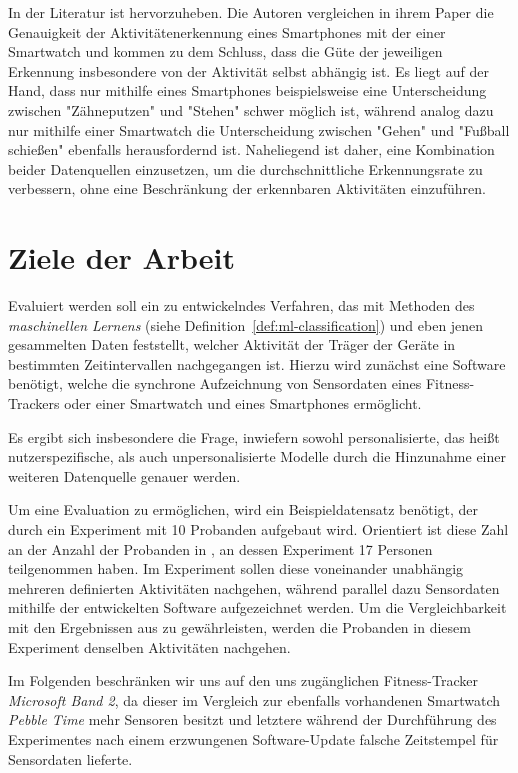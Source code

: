 In der Literatur ist \cite{Weiss2016} hervorzuheben. Die Autoren vergleichen in ihrem Paper die Genauigkeit der Aktivitätenerkennung eines Smartphones mit der einer Smartwatch und kommen zu dem Schluss, dass die Güte der jeweiligen Erkennung insbesondere von der Aktivität selbst abhängig ist. Es liegt auf der Hand, dass nur mithilfe eines Smartphones beispielsweise eine Unterscheidung zwischen "Zähneputzen" und "Stehen" schwer möglich ist, während analog dazu nur mithilfe einer Smartwatch die Unterscheidung zwischen "Gehen" und "Fußball schießen" ebenfalls herausfordernd ist. Naheliegend ist daher, eine Kombination beider Datenquellen einzusetzen, um die durchschnittliche Erkennungsrate zu verbessern, ohne eine Beschränkung der erkennbaren Aktivitäten einzuführen.

\section{Ziele der Arbeit} %
\label{sec:goals}
Evaluiert werden soll ein zu entwickelndes Verfahren, das mit Methoden des \textit{maschinellen Lernens} (siehe Definition~\ref{def:ml-classification}) und eben jenen gesammelten Daten feststellt, welcher Aktivität der Träger der Geräte in bestimmten Zeitintervallen nachgegangen ist. Hierzu wird zunächst eine Software benötigt, welche die synchrone Aufzeichnung von Sensordaten eines Fitness-Trackers oder einer Smartwatch und eines Smartphones ermöglicht.

Es ergibt sich insbesondere die Frage, inwiefern sowohl personalisierte, das heißt nutzerspezifische, als auch unpersonalisierte Modelle durch die Hinzunahme einer weiteren Datenquelle genauer werden.

Um eine Evaluation zu ermöglichen, wird ein Beispieldatensatz benötigt, der durch ein Experiment mit 10 Probanden aufgebaut wird. Orientiert ist diese Zahl an der Anzahl der Probanden in \cite{Weiss2016}, an dessen Experiment 17 Personen teilgenommen haben. Im Experiment sollen diese voneinander unabhängig mehreren definierten Aktivitäten nachgehen, während parallel dazu Sensordaten mithilfe der entwickelten Software aufgezeichnet werden. Um die Vergleichbarkeit mit den Ergebnissen aus \cite{Weiss2016} zu gewährleisten, werden die Probanden in diesem Experiment denselben Aktivitäten nachgehen.

Im Folgenden beschränken wir uns auf den uns zugänglichen Fitness-Tracker \textit{Microsoft Band 2}, da dieser im Vergleich zur ebenfalls vorhandenen Smartwatch \textit{Pebble Time} mehr Sensoren besitzt und letztere während der Durchführung des Experimentes nach einem erzwungenen Software-Update falsche Zeitstempel für Sensordaten lieferte. 

